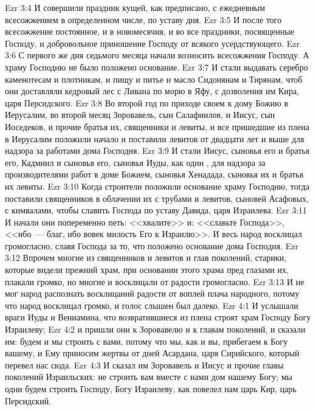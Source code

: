 \vs Ezr 3:4 И совершили праздник кущей, как предписано, с ежедневным всесожжением в определенном числе, по уставу  дня.
\vs Ezr 3:5 И после того  всесожжение постоянное, и в новомесячия, и во все праздники, посвященные Господу, и добровольное приношение Господу от всякого усердствующего.
\rsbpar\vs Ezr 3:6 С первого же дня седьмого месяца начали возносить всесожжения Господу. А храму Господню  не было положено основание.
\vs Ezr 3:7 И стали выдавать серебро каменотесам и плотникам, и пищу и питье и масло Сидонянам и Тирянам, чтоб они доставляли кедровый лес с Ливана по морю в Яфу, с дозволения им Кира, царя Персидского.
\rsbpar\vs Ezr 3:8 Во второй год по приходе своем к дому Божию в Иерусалим, во второй месяц Зоровавель, сын Салафиилов, и Иисус, сын Иоседеков, и прочие братья их, священники и левиты, и все пришедшие из плена в Иерусалим положили начало и поставили левитов от двадцати лет и выше для надзора за работами дома Господня.
\vs Ezr 3:9 И стали Иисус, сыновья его и братья его, Кадмиил и сыновья его, сыновья Иуды, как один , для надзора за производителями работ в доме Божием,  сыновья Хенадада, сыновья их и братья их левиты.
\rsbpar\vs Ezr 3:10 Когда строители положили основание храму Господню, тогда поставили священников в облачении их с трубами и левитов, сыновей Асафовых, с кимвалами, чтобы славить Господа по уставу Давида, царя Израилева.
\vs Ezr 3:11 И начали они попеременно петь: <<хвалите>> и: <<славьте Господа>>, <<ибо~--- благ, ибо вовек милость Его к Израилю>>. И весь народ восклицал громогласно, славя Господа за то, что положено основание дома Господня.
\vs Ezr 3:12 Впрочем многие из священников и левитов и глав поколений, старики, которые видели прежний храм, при основании этого храма пред глазами их, плакали громко, но многие и восклицали от радости громогласно.
\vs Ezr 3:13 И не мог народ распознать восклицаний радости от воплей плача народного, потому что народ восклицал громко, и голос слышен был далеко.
\vs Ezr 4:1 И услышали враги Иуды и Вениамина, что возвратившиеся из плена строят храм Господу Богу Израилеву;
\vs Ezr 4:2 и пришли они к Зоровавелю и к главам поколений, и сказали им: будем и мы строить с вами, потому что мы, как и вы, прибегаем к Богу вашему, и Ему приносим жертвы от дней Асардана, царя Сирийского, который перевел нас сюда.
\vs Ezr 4:3 И сказал им Зоровавель и Иисус и прочие главы поколений Израильских: не строить вам вместе с нами дом нашему Богу; мы одни будем строить  Господу, Богу Израилеву, как повелел нам царь Кир, царь Персидский.
